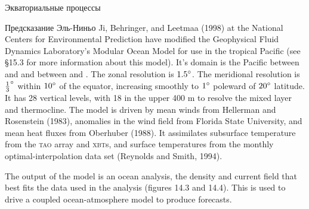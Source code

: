 \begin{chapter}{Экваториальные процессы}
\begin{section}{Предсказание Эль-Ниньо}
Ji, Behringer, and Leetmaa (1998) at the National Centers for
Environmental Prediction have modified the Geophysical Fluid Dynamics
Laboratory's Modular Ocean Model for use in the tropical Pacific (see
\S15.3 for more information about this model). It's domain is the
Pacific between  and  and between
 and . The zonal resolution is
${1.5}^\circ$. The meridional resolution is ${\frac{1}{3}}^\circ$
within ${10}^\circ$ of the equator, increasing smoothly
to ${1}^\circ$ poleward of ${20}^\circ$ latitude. It has 28 vertical
levels, with 18 in the upper 400 m to resolve the mixed
layer and
thermocline. The model is
driven by mean winds from Hellerman and Rosenstein (1983),
anomalies in the wind field from Florida State
University, and mean heat fluxes from
Oberhuber (1988). It assimilates subsurface temperature from the
\textsc{tao} array and \textsc{xbt}s, and surface temperatures from
the monthly optimal-interpolation data set (Reynolds and Smith, 1994).
%

The output of the model is an ocean analysis, the density and current
field that best fits the data used in the analysis (figures 14.3 and
14.4). This is used to drive a coupled ocean-atmosphere model to
produce forecasts.
%


\end{section}
\end{chapter}

